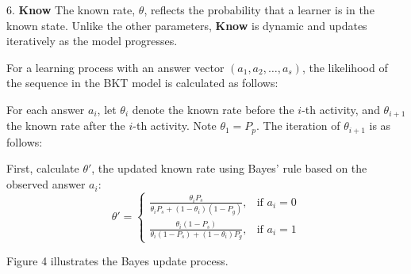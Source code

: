 \documentclass{article}
\begin{document}
6. \textbf{Know}  
The known rate, \( \theta \), reflects the probability that a learner is in the known state. Unlike the other parameters, \textbf{Know} is dynamic and updates iteratively as the model progresses.

For a learning process with an answer vector \( (a_1, a_2, \dots, a_s) \), the likelihood of the sequence in the BKT model is calculated as follows:

For each answer \( a_i \), let \(\theta_{i}\) denote the known rate before the \(i\)-th activity, and \(\theta_{i+1}\) the known rate after the \(i\)-th activity. Note \(\theta_1 = P_p\). The iteration of \(\theta_{i+1}\) is as follows:

First, calculate \(\theta'\), the updated known rate using Bayes' rule based on the observed answer \( a_i \):
\[
\theta' = 
\begin{cases} 
    \frac{\theta_{i} P_s}{\theta_{i} P_s + (1 - \theta_{i}) (1 - P_g)}, & \text{if } a_i = 0 \\[10pt]
    \frac{\theta_{i} (1 - P_s)}{\theta_{i} (1 - P_s) + (1 - \theta_{i}) P_g}, & \text{if } a_i = 1 
\end{cases}
\]

Figure 4 illustrates the Bayes update process.

\begin{center}
\end{center}
\end{document}
